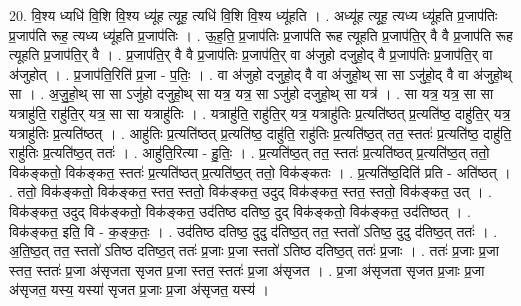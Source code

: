 \documentclass[17pt]{extarticle}
\begin{document}
20. वि॒श्य ध्यधि॑ वि॒शि वि॒श्य ध्यू॑ह त्यूह॒ त्यधि॑ वि॒शि वि॒श्य ध्यू॑हति । . अध्यू॑ह त्यूह॒ त्यध्य ध्यू॑हति प्र॒जाप॑तिः प्र॒जाप॑ति रूह॒ त्यध्य ध्यू॑हति प्र॒जाप॑तिः । . ऊ॒ह॒ति॒ प्र॒जाप॑तिः प्र॒जाप॑ति रूह त्यूहति प्र॒जाप॑ति॒र् वै वै प्र॒जाप॑ति रूह त्यूहति प्र॒जाप॑ति॒र् वै । . प्र॒जाप॑ति॒र् वै वै प्र॒जाप॑तिः प्र॒जाप॑ति॒र् वा अ॑जुहो दजुहो॒द् वै प्र॒जाप॑तिः प्र॒जाप॑ति॒र् वा अ॑जुहोत् । . प्र॒जाप॑ति॒रिति॑ प्र॒जा - प॒तिः॒ । . वा अ॑जुहो दजुहो॒द् वै वा अ॑जुहो॒थ् सा सा ऽजु॑हो॒द् वै वा अ॑जुहो॒थ् सा । . अ॒जु॒हो॒थ् सा सा ऽजु॑हो दजुहो॒थ् सा यत्र॒ यत्र॒ सा ऽजु॑हो दजुहो॒थ् सा यत्र॑ । . सा यत्र॒ यत्र॒ सा सा यत्राहु॑ति॒ राहु॑ति॒र् यत्र॒ सा सा यत्राहु॑तिः । . यत्राहु॑ति॒ राहु॑ति॒र् यत्र॒ यत्राहु॑तिः प्र॒त्यति॑ष्ठत् प्र॒त्यति॑ष्ठ॒ दाहु॑ति॒र् यत्र॒ यत्राहु॑तिः प्र॒त्यति॑ष्ठत् । . आहु॑तिः प्र॒त्यति॑ष्ठत् प्र॒त्यति॑ष्ठ॒ दाहु॑ति॒ राहु॑तिः प्र॒त्यति॑ष्ठ॒त् तत॒ स्ततः॑ प्र॒त्यति॑ष्ठ॒ दाहु॑ति॒ राहु॑तिः प्र॒त्यति॑ष्ठ॒त् ततः॑ । . आहु॑ति॒रित्या - हु॒तिः॒ । . प्र॒त्यति॑ष्ठ॒त् तत॒ स्ततः॑ प्र॒त्यति॑ष्ठत् प्र॒त्यति॑ष्ठ॒त् ततो॒ विक॑ङ्कतो॒ विक॑ङ्कत॒ स्ततः॑ प्र॒त्यति॑ष्ठत् प्र॒त्यति॑ष्ठ॒त् ततो॒ विक॑ङ्कतः । . प्र॒त्यति॑ष्ठ॒दिति॑ प्रति - अति॑ष्ठत् । . ततो॒ विक॑ङ्कतो॒ विक॑ङ्कत॒ स्तत॒ स्ततो॒ विक॑ङ्कत॒ उदुद् विक॑ङ्कत॒ स्तत॒ स्ततो॒ विक॑ङ्कत॒ उत् । . विक॑ङ्कत॒ उदुद् विक॑ङ्कतो॒ विक॑ङ्कत॒ उद॑तिष्ठ दतिष्ठ॒ दुद् विक॑ङ्कतो॒ विक॑ङ्कत॒ उद॑तिष्ठत् । . विक॑ङ्कत॒ इति॒ वि - क॒ङ्क॒तः॒ । . उद॑तिष्ठ दतिष्ठ॒ दुदु द॑तिष्ठ॒त् तत॒ स्ततो॑ ऽतिष्ठ॒ दुदु द॑तिष्ठ॒त् ततः॑ । . अ॒ति॒ष्ठ॒त् तत॒ स्ततो॑ ऽतिष्ठ दतिष्ठ॒त् ततः॑ प्र॒जाः प्र॒जा स्ततो॑ ऽतिष्ठ दतिष्ठ॒त् ततः॑ प्र॒जाः । . ततः॑ प्र॒जाः प्र॒जा स्तत॒ स्ततः॑ प्र॒जा अ॑सृजता सृजत प्र॒जा स्तत॒ स्ततः॑ प्र॒जा अ॑सृजत । . प्र॒जा अ॑सृजता सृजत प्र॒जाः प्र॒जा अ॑सृजत॒ यस्य॒ यस्या॑ सृजत प्र॒जाः प्र॒जा अ॑सृजत॒ यस्य॑ । \newline
\end{document}
